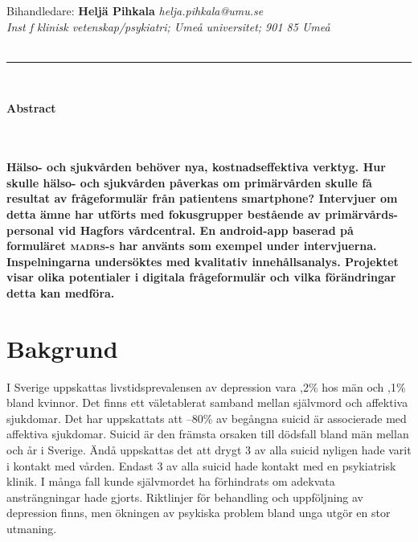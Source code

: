 \documentclass[12pt,a4paper,oneside]{article}
\let\oldcite\cite
\renewcommand*\cite[1]{\textsuperscript{\oldcite{#1}}}
\renewcommand{\abstractname}{Abstract}
\renewenvironment{abstract}
 {\small
  \vspace{1em}\hspace{-1.5em}\bfseries \abstractname\vspace{-.5em}\vspace{0pt}
  \list{}{%
    \setlength{\leftmargin}{0mm}%
    \setlength{\rightmargin}{\leftmargin}%
  }%
  \item\relax}
 {\endlist}
\begin{document}
 {\small Bihandledare:} {\small \bf Helj{\"a} Pihkala} {\small \it helja.pihkala@umu.se}\\
 {\small\it Inst f klinisk vetenskap/psykiatri; Ume\r{a} universitet; 901 85 Ume\r{a}}\vspace{.5cm}\\
{}\\
\hrule
\ \\
\selectfont

\begin{abstract}
\ \\\vspace{-2em}\ \\
\bfseries{
H{\"a}lso- och sjukv{\aa}rden beh{\"o}ver nya, kostnadseffektiva verktyg. Hur skulle h{\"a}lso- och sjukv{\aa}rden p{\aa}verkas om prim{\"a}rv{\aa}rden skulle f{\aa} resultat av fr{\aa}geformul{\"a}r fr{\aa}n patientens smartphone? Intervjuer om detta {\"a}mne har utf{\"o}rts med fokusgrupper best{\aa}ende av prim{\"a}rv{\aa}rds-personal vid Hagfors v{\aa}rdcentral. En android-app baserad p{\aa} formul{\"a}ret \textbf{\textsc{madrs-s}} har anv{\"a}nts som exempel under intervjuerna. Inspelningarna unders{\"o}ktes med kvalitativ inneh{\aa}llsanalys. Projektet visar olika potentialer i digitala fr{\aa}geformul{\"a}r och vilka f{\"o}r{\"a}ndringar detta kan medf{\"o}ra.
}
\end{abstract}

\section*{Bakgrund}
I Sverige uppskattas livstidsprevalensen av depression vara {,2}\% hos m{\"a}n och {,1}\% bland kvinnor\cite{numbers0}. Det finns ett v{\"a}letablerat samband mellan sj{\"a}lvmord och affektiva sjukdomar\cite{numbers1.1}. Det har uppskattats att {--80}\% av beg{\aa}ngna suicid {\"a}r associerade med affektiva sjukdomar\cite{numbers1.1}. Suicid {\"a}r den fr{\"a}msta orsaken till d{\"o}dsfall bland m{\"a}n mellan {} och {} {\aa}r i Sverige\cite{numbers3.0.1}. {\"A}nd{\aa} uppskattas det att drygt  {3} av alla suicid nyligen hade varit i kontakt med v{\aa}rden. Endast  {3} av alla suicid hade kontakt med en psykiatrisk klinik\cite{numbers2}. I m{\aa}nga fall kunde sj{\"a}lvmordet ha f{\"o}rhindrats om adekvata anstr{\"a}ngningar hade gjorts\cite{numbers1}. Riktlinjer f{\"o}r behandling och uppf{\"o}ljning av depression finns, men {\"o}kningen av psykiska problem bland unga utg{\"o}r en stor utmaning\cite{guide1, regionjh1}.
\end{document}
